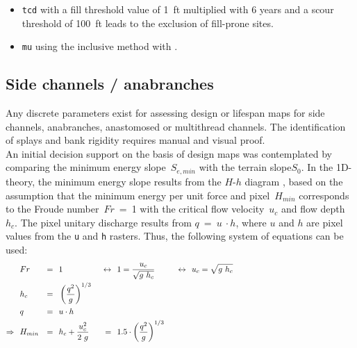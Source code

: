 \begin{itemize}
	\item \texttt{tcd} with a fill threshold value of 1~ft multiplied with 6 years and a scour threshold of 100~ft leads to the exclusion of fill-prone sites.
	\item \texttt{mu} using the inclusive method with .
\end{itemize}


\clearpage
\subsection{Side channels / anabranches}\label{sec:sidechnl}
Any discrete parameters exist for assessing design or lifespan maps for side channels, anabranches, anastomosed or multithread channels. The identification of splays and bank rigidity requires manual and visual proof.\\

An initial decision support on the basis of design maps was contemplated by comparing the minimum energy slope~$S_{e,min}$ with the terrain slope$S_0$. In the 1D-theory, the minimum energy slope results from the $H$-$h$ diagram \citep{glenn15}, based on the assumption that the minimum energy per unit force and pixel~$H_{min}$ corresponds to the Froude number~$Fr$~=~1 with the critical flow velocity~$u_c$ and flow depth~$h_c$. The pixel unitary discharge results from $q$~=~$u~\cdot h$, where $u$ and $h$ are pixel values from the \texttt{u} and \texttt{h} rasters. Thus, the following system of equations can be used:
\begin{subequations}
\begin{flalign}
&Fr &=&\hspace{0.25cm} 1 &\leftrightarrow \hspace{0.25cm} &1 = \frac{u_c}{\sqrt{g~h_c}} &\hspace{0.25cm}\leftrightarrow& \hspace{0.25cm}u_c = \sqrt{g~h_c}& \hspace{5.0cm}\label{eq:Fr} \\
&h_c &=&\hspace{0.25cm} \left(\frac{q^2}{g}\right)^{1/3} &&&&\label{eq:hc}\\
&q &=&\hspace{0.25cm} u \cdot h &&&&\label{eq:q}\\
\Rightarrow \hspace{0.25cm}&H_{min} &=&\hspace{0.25cm} h_c + \frac{u_c^2}{2~g} &\hspace{0.25cm}=\hspace{0.25cm}& 1.5\cdot \left(\frac{q^2}{g}\right)^{1/3}&&&\label{eq:Hmin}
\end{flalign}
\end{subequations}

